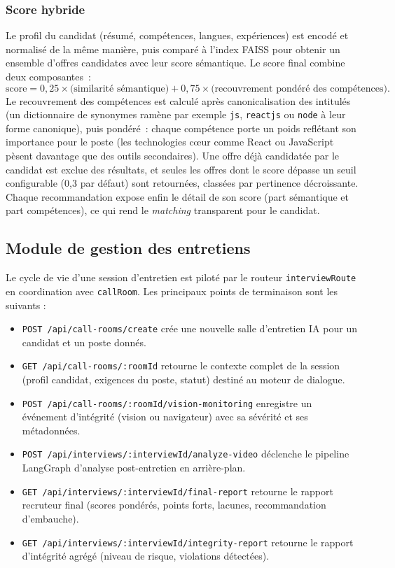 \subsubsection{Score hybride}

Le profil du candidat (résumé, compétences, langues, expériences) est encodé et normalisé de la
même manière, puis comparé à l'index FAISS pour obtenir un ensemble d'offres candidates avec
leur score sémantique. Le score final combine deux composantes~:
\[
  \text{score} = 0{,}25 \times \text{(similarité sémantique)} + 0{,}75 \times \text{(recouvrement pondéré des compétences)}.
\]
Le recouvrement des compétences est calculé après canonicalisation des intitulés (un
dictionnaire de synonymes ramène par exemple \texttt{js}, \texttt{reactjs} ou \texttt{node} à
leur forme canonique), puis pondéré~: chaque compétence porte un poids reflétant son importance
pour le poste (les technologies cœur comme React ou JavaScript pèsent davantage que des outils
secondaires). Une offre déjà candidatée par le candidat est exclue des résultats, et seules les
offres dont le score dépasse un seuil configurable (0{,}3 par défaut) sont retournées, classées
par pertinence décroissante. Chaque recommandation expose enfin le détail de son score
(part sémantique et part compétences), ce qui rend le \textit{matching} transparent pour le
candidat.

\subsection{Module de gestion des entretiens}

Le cycle de vie d'une session d'entretien est piloté par le routeur \texttt{interviewRoute}
en coordination avec \texttt{callRoom}. Les principaux points de terminaison sont les
suivants :

\begin{itemize}
  \item \texttt{POST /api/call-rooms/create} crée une nouvelle salle d'entretien IA pour
        un candidat et un poste donnés.
  \item \texttt{GET /api/call-rooms/:roomId} retourne le contexte complet de la session
        (profil candidat, exigences du poste, statut) destiné au moteur de dialogue.
  \item \texttt{POST /api/call-rooms/:roomId/vision-monitoring} enregistre un événement
        d'intégrité (vision ou navigateur) avec sa sévérité et ses métadonnées.
  \item \texttt{POST /api/interviews/:interviewId/analyze-video} déclenche le pipeline
        LangGraph d'analyse post-entretien en arrière-plan.
  \item \texttt{GET /api/interviews/:interviewId/final-report} retourne le rapport recruteur
        final (scores pondérés, points forts, lacunes, recommandation d'embauche).
  \item \texttt{GET /api/interviews/:interviewId/integrity-report} retourne le rapport
        d'intégrité agrégé (niveau de risque, violations détectées).
\end{itemize}

